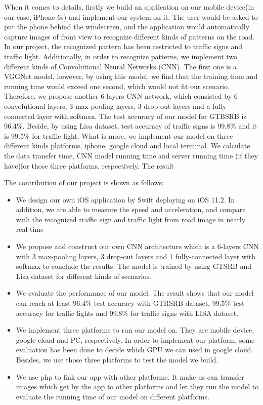 \documentclass[conference]{IEEEtran}
\begin{document}
When it comes to details, firstly we build an application on our mobile device(in our case, iPhone 6s) and implement our system on it. The user would be asked to put the phone behind the windscreen, and the application would automatically capture images of front view to recognize different kinds of patterns on the road. In our project, the recognized pattern has been restricted to traffic signs and traffic light. Additionally, in order to recognize patterns, we implement two different kinds of Convolutional Neural Networks (CNN). The first one is a VGGNet model, however, by using this model, we find that the training time and running time would exceed one second, which would not fit our scenario. Therefore, we propose another 6-layers CNN network, which consisted by 6 convolutional layers, 3 max-pooling layers, 3 drop-out layers and a fully connected layer with softmax. The test accuracy of our model for GTBSRB is 96.4\%.  Beside, by using Lisa dataset, test accuracy of traffic signs is 99.8\% and it is 99.5\% for traffic light. What is more, we implement our model on three different kinds platforms, iphone, google cloud and local terminal. We calculate the data transfer time, CNN model running time and server running time (if they have)for those three platforms, respectively. The result


The contribution of our project is shown as follows: 

\begin{itemize}
  \item We design our own iOS application by Swift deploying on iOS 11.2. In addition, we are able to measure the speed and acceleration, and compare with the recognized traffic sign and traffic light from road image in nearly real-time 
  \item We propose and construct our own CNN architecture which is a 6-layers CNN with 3 max-pooling layers, 3 drop-out layers and 1 fully-connected layer with softmax to conclude the results. The model is trained by using GTSRB and Lisa dataset for different kinds of scenarios.
  \item We evaluate the performance of our model. The result shows that our model can reach at least 96.4\% test accuracy with GTRSRB dataset, 99.5\% test accuracy for traffic lights and 99.8\% for traffic signs with LISA dataset.
  \item We implement three platforms to run our model on. They are mobile device, google cloud and PC, respectively. In order to implement our platform, some evaluation has been done to decide which GPU we can used in google cloud. Besides, we use those three platforms to test the model we build.
  \item  We use php to link our app with other platforms. It make us can transfer images which get by the app to other platforms and let they run the model to evaluate the running time of our model on different platforms.
\end{itemize}
\end{document}

